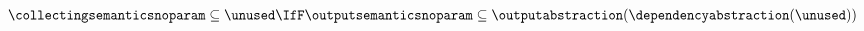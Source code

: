 \begin{align*}
    \collectingsemanticsnoparam \subseteq \unused \IfF \outputsemanticsnoparam \subseteq \outputabstraction(\dependencyabstraction(\unused))
  \end{align*}
